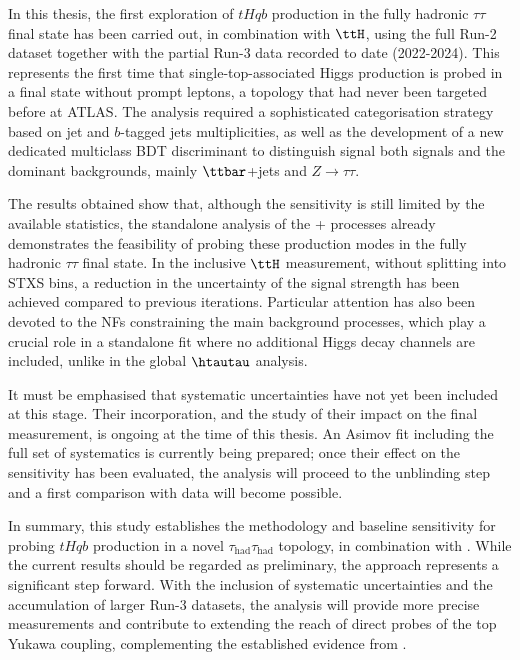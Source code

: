 In this thesis, the first exploration of \(tHqb\) production in the fully hadronic \(\tau\tau\) final state has been carried out, in combination with \(\ttH\), using the full Run-2 dataset together with the partial Run-3 data recorded to date (2022-2024). This represents the first time that single-top-associated Higgs production is probed in a final state without prompt leptons, a topology that had never been targeted before at ATLAS. The analysis required a sophisticated categorisation strategy based on jet and \(b\)-tagged jets multiplicities, as well as the development of a new dedicated multiclass BDT discriminant to distinguish signal both signals and the dominant backgrounds, mainly \(\ttbar\)+jets and \(Z\to\tau\tau\).  

The results obtained show that, although the sensitivity is still limited by the available statistics, the standalone analysis of the \thqb + \ttH processes already demonstrates the feasibility of probing these production modes in the fully hadronic \(\tau\tau\) final state. In the inclusive \(\ttH\) measurement, without splitting into STXS bins, a reduction in the uncertainty of the signal strength has been achieved compared to previous iterations. Particular attention has also been devoted to the NFs constraining the main background processes, which play a crucial role in a standalone fit where no additional Higgs decay channels are included, unlike in the global \(\htautau\) analysis.  

It must be emphasised that systematic uncertainties have not yet been included at this stage. Their incorporation, and the study of their impact on the final measurement, is ongoing at the time of this thesis. An Asimov fit including the full set of systematics is currently being prepared; once their effect on the sensitivity has been evaluated, the analysis will proceed to the unblinding step and a first comparison with data will become possible.  

In summary, this study establishes the methodology and baseline sensitivity for probing \(tHqb\) production in a novel \(\tau_{\mathrm{had}}\tau_{\mathrm{had}}\) topology, in combination with \ttH. While the current results should be regarded as preliminary, the approach represents a significant step forward. With the inclusion of systematic uncertainties and the accumulation of larger Run-3 datasets, the analysis will provide more precise measurements and contribute to extending the reach of direct probes of the top Yukawa coupling, complementing the established evidence from \ttH.  
